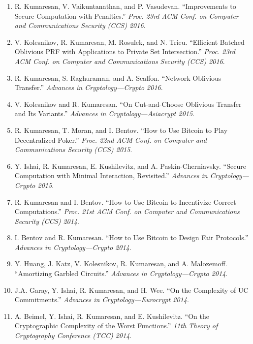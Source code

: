 \documentclass[11pt]{article}
\begin{document}
\begin{enumerate}[leftmargin=*, itemsep=1pt]
    \item R. Kumaresan, V. Vaikuntanathan, and P. Vasudevan. ``Improvements to Secure Computation with Penalties.'' \textit{Proc. 23rd ACM Conf. on Computer and Communications Security (CCS) 2016}.
    
    \item V. Kolesnikov, R. Kumaresan, M. Rosulek, and N. Trieu. ``Efficient Batched Oblivious PRF with Applications to Private Set Intersection.'' \textit{Proc. 23rd ACM Conf. on Computer and Communications Security (CCS) 2016}.
    
    \item R. Kumaresan, S. Raghuraman, and A. Sealfon. ``Network Oblivious Transfer.'' \textit{Advances in Cryptology—Crypto 2016}.
    
    \item V. Kolesnikov and R. Kumaresan. ``On Cut-and-Choose Oblivious Transfer and Its Variants.'' \textit{Advances in Cryptology—Asiacrypt 2015}.
    
    \item R. Kumaresan, T. Moran, and I. Bentov. ``How to Use Bitcoin to Play Decentralized Poker.'' \textit{Proc. 22nd ACM Conf. on Computer and Communications Security (CCS) 2015}.
    
    \item Y. Ishai, R. Kumaresan, E. Kushilevitz, and A. Paskin-Cherniavsky. ``Secure Computation with Minimal Interaction, Revisited.'' \textit{Advances in Cryptology—Crypto 2015}.
    
    \item R. Kumaresan and I. Bentov. ``How to Use Bitcoin to Incentivize Correct Computations.'' \textit{Proc. 21st ACM Conf. on Computer and Communications Security (CCS) 2014}.
    
    \item I. Bentov and R. Kumaresan. ``How to Use Bitcoin to Design Fair Protocols.'' \textit{Advances in Cryptology—Crypto 2014}.
    
    \item Y. Huang, J. Katz, V. Kolesnikov, R. Kumaresan, and A. Malozemoff. ``Amortizing Garbled Circuits.'' \textit{Advances in Cryptology—Crypto 2014}.
    
    \item J.A. Garay, Y. Ishai, R. Kumaresan, and H. Wee. ``On the Complexity of UC Commitments.'' \textit{Advances in Cryptology—Eurocrypt 2014}.
    
    \item A. Beimel, Y. Ishai, R. Kumaresan, and E. Kushilevitz. ``On the Cryptographic Complexity of the Worst Functions.'' \textit{11th Theory of Cryptography Conference (TCC) 2014}.
    

\end{enumerate}
\end{document}
